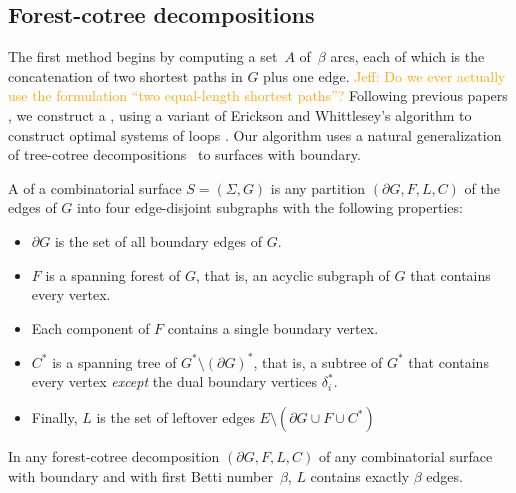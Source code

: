 \documentclass[letterpaper,review]{siamart190516}
\def\jnote#1{\textcolor{orange}{Jeff: #1}}
\begin{document}
\subsection{Forest-cotree decompositions}
\label{sec:forest-cotree}

The first method begins by computing a set~$A$ of~$\beta$ arcs, each of which is the concatenation of two shortest paths in $G$ plus one edge.  \jnote{Do we ever actually use the formulation “two equal-length shortest paths”?}
%
Following previous papers \cite{ccelw-scsih-08, ce-tnpcs-10, c-scgsp-10}, we construct a , using a variant of Erickson and Whittlesey's algorithm to construct optimal systems of loops \cite{ew-gohhg-05}.  Our algorithm uses a natural generalization of tree-cotree decompositions~\cite{e-dgteg-03} to surfaces with boundary.

A  of a combinatorial surface $S = (\Sigma, G)$ is any partition $(\partial\! G, F, L, C)$ of the edges of $G$ into four edge-disjoint subgraphs with the following properties:
\begin{itemize}\itemsep0pt
\item $\partial\! G$ is the set of all boundary edges of $G$.
\item $F$ is a spanning forest of $G$, that is, an acyclic subgraph of $G$ that contains every vertex.
\item Each component of $F$ contains a single boundary vertex.
\item $C^*$ is a spanning tree of $G^*\setminus (\partial G)^*$, that is, a subtree of $G^*$ that contains every vertex \emph{except} the dual boundary vertices $\delta_i^*$.
\item Finally, $L$ is the set of leftover edges $E \setminus (\partial\!G \cup F \cup C^*)$
\end{itemize}

\begin{lemma}
\label{lem:L_edges}
In any forest-cotree decomposition $(\partial\! G, F, L, C)$ of any combinatorial surface with boundary and with first Betti number~$\beta$,  $L$ contains exactly $\beta$ edges.
\end{lemma}
\end{document}
